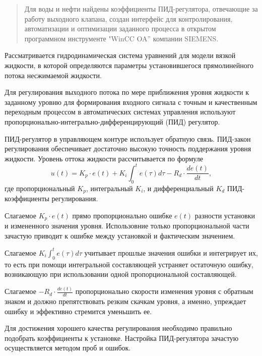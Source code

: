 \begin{abstract}
Для воды и нефти найдены коэффициенты ПИД-регулятора, отвечающие за работу выходного клапана, создан интерфейс для контролирования, автоматизации и оптимизации заданного процесса в открытом программном инструменте "WinCC OA” компании SIEMENS.

\end{abstract}


Рассматривается гидродинамическая система уравнений для модели вязкой жидкости, в которой определяются параметры установившегося прямолинейного потока несжимаемой жидкости.

Для регулирования выходного потока по мере приближения уровня жидкости к заданному уровню для формирования входного сигнала с точным и качественным переходным процессом в автоматических системах управления используют пропорционально-интегрально-дифференцирующий (ПИД) регулятор.

ПИД-регулятор в управляющем контуре использует обратную связь. ПИД-закон регулирования обеспечивает достаточно высокую точность поддержания уровня жидкости. Уровень оттока жидкости рассчитывается по формуле
$$
u(t)=K_p\cdot e(t)+K_i\int_0^te(\tau)d\tau-R_d\cdot\frac{de(t)}{dt},
$$
где пропорциональный $K_p$, интегральный $K_i$, и дифференциальный $K_d$  ПИД-коэффициенты регулирования.

Слагаемое $K_p\cdot e(t)$ прямо пропорционально ошибке $e(t)$ разности установки и измененного значения уровня. Использовние только пропорциональной части зачастую приводит к ошибке между установкой и фактическим значением.

Слагаемое $K_i\int_0^te(\tau)d\tau$ учитывает прошлые значения ошибки и интегрирует их, то есть при помощи интегральной составляющей устраняет остаточную ошибку, возникающую при использовании одной пропорциональной составляющей.

Слагаемое $-R_d\cdot\frac{de(t)}{dt}$ пропорционально скорости изменения уровня с обратным знаком и должно препятствовать резким скачкам уровня, а именно, упреждает ошибку и эффективно стремится уменьшить ее.

Для достижения хорошего качества регулирования необходимо правильно подобрать коэффициенты к установке. Настройка ПИД-регулятора зачастую осуществляется  методом проб и ошибок.  

